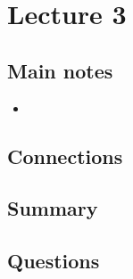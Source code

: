 \section{Lecture 3}

\subsection{Main notes}



\begin{itemize}
	\item
\end{itemize}


\subsection{Connections}


\subsection{Summary}


\subsection{Questions}
